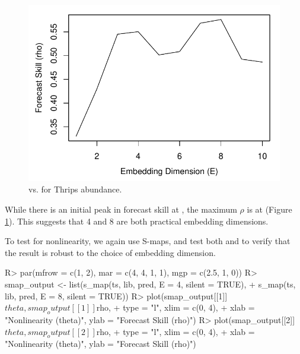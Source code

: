 \documentclass[article]{jss}
\begin{document}
\begin{figure}[t!]
\begin{center}
\includegraphics[width=5in]{article-thrips-simplex}
\end{center}
\caption{\label{fig:thrips-simplex}  vs.  for Thrips abundance.}
\end{figure}

While there is an initial peak in forecast skill at , the maximum $\rho$ is at  (Figure \ref{fig:thrips-simplex}). This suggests that 4 and 8 are both practical embedding dimensions.

To test for nonlinearity, we again use S-maps, and test both  and  to verify that the result is robust to the choice of embedding dimension.

\begin{Schunk}
\begin{Sinput}
R> par(mfrow = c(1, 2), mar = c(4, 4, 1, 1), mgp = c(2.5, 1, 0))
R> smap_output <- list(s_map(ts, lib, pred, E = 4, silent = TRUE),
+                      s_map(ts, lib, pred, E = 8, silent = TRUE))
R> plot(smap_output[[1]]$theta, smap_output[[1]]$rho, 
+       type = "l", xlim = c(0, 4),
+       xlab = "Nonlinearity (theta)", ylab = "Forecast Skill (rho)")
R> plot(smap_output[[2]]$theta, smap_output[[2]]$rho, 
+       type = "l", xlim = c(0, 4),
+       xlab = "Nonlinearity (theta)", ylab = "Forecast Skill (rho)")
\end{Sinput}
\end{Schunk}
\end{document}
